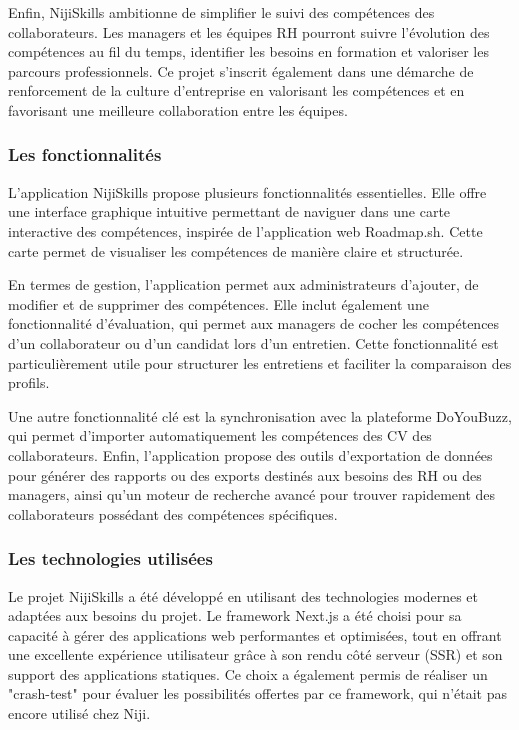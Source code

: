 \documentclass[12pt]{article}
\begin{document}
Enfin, NijiSkills ambitionne de simplifier le suivi des compétences des collaborateurs. Les managers et les équipes RH pourront suivre l'évolution des compétences au fil du temps, identifier les besoins en formation et valoriser les parcours professionnels. Ce projet s'inscrit également dans une démarche de renforcement de la culture d'entreprise en valorisant les compétences et en favorisant une meilleure collaboration entre les équipes.


\subsubsection{Les fonctionnalités}
L'application NijiSkills propose plusieurs fonctionnalités essentielles. Elle offre une interface graphique intuitive permettant de naviguer dans une carte interactive des compétences, inspirée de l'application web Roadmap.sh. Cette carte permet de visualiser les compétences de manière claire et structurée.

En termes de gestion, l'application permet aux administrateurs d'ajouter, de modifier et de supprimer des compétences. Elle inclut également une fonctionnalité d'évaluation, qui permet aux managers de cocher les compétences d'un collaborateur ou d'un candidat lors d'un entretien. Cette fonctionnalité est particulièrement utile pour structurer les entretiens et faciliter la comparaison des profils.

Une autre fonctionnalité clé est la synchronisation avec la plateforme DoYouBuzz, qui permet d'importer automatiquement les compétences des CV des collaborateurs. Enfin, l'application propose des outils d'exportation de données pour générer des rapports ou des exports destinés aux besoins des RH ou des managers, ainsi qu'un moteur de recherche avancé pour trouver rapidement des collaborateurs possédant des compétences spécifiques.

\subsubsection{Les technologies utilisées}
Le projet NijiSkills a été développé en utilisant des technologies modernes et adaptées aux besoins du projet. Le framework Next.js a été choisi pour sa capacité à gérer des applications web performantes et optimisées, tout en offrant une excellente expérience utilisateur grâce à son rendu côté serveur (SSR) et son support des applications statiques. Ce choix a également permis de réaliser un "crash-test" pour évaluer les possibilités offertes par ce framework, qui n'était pas encore utilisé chez Niji.
\end{document}
